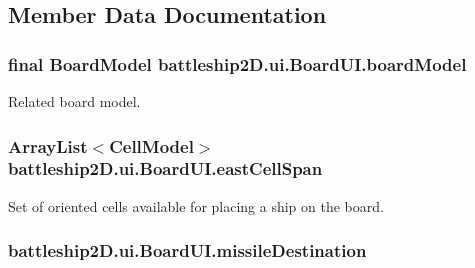 \subsection{Member Data Documentation}
\hypertarget{classbattleship2D_1_1ui_1_1BoardUI_a6c61b16484c780fb58e68bc8fb1494e6}{
\subsubsection[{board\-Model}]{\setlength{\rightskip}{0pt plus 5cm}final {\bf Board\-Model} battleship2\-D.\-ui.\-Board\-U\-I.\-board\-Model\hspace{0.3cm}{\ttfamily [protected]}}}\label{classbattleship2D_1_1ui_1_1BoardUI_a6c61b16484c780fb58e68bc8fb1494e6}


Related board model. 

\hypertarget{classbattleship2D_1_1ui_1_1BoardUI_a315014776bda2cb2a79e90d62a41c0af}{
\subsubsection[{east\-Cell\-Span}]{\setlength{\rightskip}{0pt plus 5cm}Array\-List$<${\bf Cell\-Model}$>$ battleship2\-D.\-ui.\-Board\-U\-I.\-east\-Cell\-Span\hspace{0.3cm}{\ttfamily [protected]}}}\label{classbattleship2D_1_1ui_1_1BoardUI_a315014776bda2cb2a79e90d62a41c0af}


Set of oriented cells available for placing a ship on the board. 

\hypertarget{classbattleship2D_1_1ui_1_1BoardUI_a97417a860426981ff901e82029b4936e}{
\subsubsection[{missile\-Destination}]{ battleship2\-D.\-ui.\-Board\-U\-I.\-missile\-Destination\hspace{0.3cm}{\ttfamily [protected]}}}\label{classbattleship2D_1_1ui_1_1BoardUI_a97417a860426981ff901e82029b4936e}


